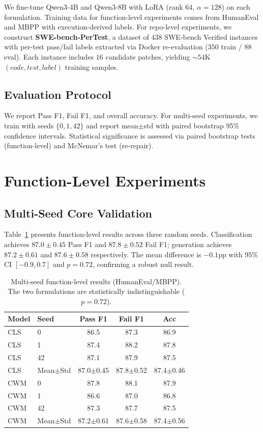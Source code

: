 \documentclass[11pt,a4paper]{article}
\begin{document}
We fine-tune Qwen3-4B and Qwen3-8B with LoRA (rank 64, $\alpha{=}128$) on each formulation. Training data for function-level experiments comes from HumanEval and MBPP with execution-derived labels. For repo-level experiments, we construct \textbf{SWE-bench-PerTest}, a dataset of $438$ SWE-bench Verified instances with per-test pass/fail labels extracted via Docker re-evaluation ($350$ train / $88$ eval). Each instance includes $16$ candidate patches, yielding ${\sim}54$K $(code, test, label)$ training samples.

\subsection{Evaluation Protocol}

We report Pass F1, Fail F1, and overall accuracy. For multi-seed experiments, we train with seeds $\{0, 1, 42\}$ and report mean$\pm$std with paired bootstrap 95\% confidence intervals. Statistical significance is assessed via paired bootstrap tests (function-level) and McNemar's test (re-repair).

\section{Function-Level Experiments}
\label{sec:func_level}

\subsection{Multi-Seed Core Validation}

Table~\ref{tab:multiseed} presents function-level results across three random seeds. Classification achieves $87.0{\pm}0.45$ Pass F1 and $87.8{\pm}0.52$ Fail F1; generation achieves $87.2{\pm}0.61$ and $87.6{\pm}0.58$ respectively. The mean difference is $-0.1$pp with 95\% CI $[-0.9, 0.7]$ and $p{=}0.72$, confirming a robust null result.

\begin{table}[t]
\centering
\small
\caption{Multi-seed function-level results (HumanEval/MBPP). The two formulations are statistically indistinguishable ($p{=}0.72$).}
\label{tab:multiseed}
\begin{tabular}{llccc}
\toprule
\textbf{Model} & \textbf{Seed} & \textbf{Pass F1} & \textbf{Fail F1} & \textbf{Acc} \\
\midrule
CLS & 0 & 86.5 & 87.3 & 86.9 \\
CLS & 1 & 87.4 & 88.2 & 87.8 \\
CLS & 42 & 87.1 & 87.9 & 87.5 \\
CLS & Mean$\pm$Std & 87.0$\pm$0.45 & 87.8$\pm$0.52 & 87.4$\pm$0.46 \\
\midrule
CWM & 0 & 87.8 & 88.1 & 87.9 \\
CWM & 1 & 86.6 & 87.0 & 86.8 \\
CWM & 42 & 87.3 & 87.7 & 87.5 \\
CWM & Mean$\pm$Std & 87.2$\pm$0.61 & 87.6$\pm$0.58 & 87.4$\pm$0.56 \\
\bottomrule
\end{tabular}
\end{table}
\end{document}
